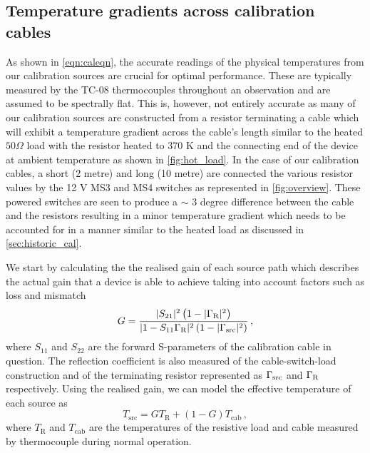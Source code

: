 \subsection{Temperature gradients across calibration cables}\label{sec:cable_gradient}
As shown in \cref{eqn:caleqn}, the accurate readings of the physical temperatures from our calibration sources are crucial for optimal performance. These are typically measured by the TC-08 thermocouples throughout an observation and are assumed to be spectrally flat. This is, however, not entirely accurate as many of our calibration sources are constructed from a resistor terminating a cable which will exhibit a temperature gradient across the cable’s length similar to the heated $50 \Omega$ load with the resistor heated to 370 K and the connecting end of the device at ambient temperature as shown in \cref{fig:hot_load}. In the case of our calibration cables, a short (2 metre) and long (10 metre) are connected the various resistor values by the 12 V MS3 and MS4 switches as represented in \cref{fig:overview}. These powered switches are seen to produce a $\sim$ 3 degree difference between the cable and the resistors resulting in a minor temperature gradient which needs to be accounted for in a manner similar to the heated load as discussed in \cref{sec:historic_cal}.

We start by calculating the the realised gain of each source path which describes the actual gain that a device is able to achieve taking into account factors such as loss and mismatch
\begin{equation}
    G = \frac{ |S_{21}|^2 \left( 1 - |\Gamma_{\mathrm{\mathrm{R}}}|^2 \right) }{ |1 - S_{11} \Gamma_{\mathrm{\mathrm{R}}}|^2 \left( 1 - |\Gamma_{\mathrm{\mathrm{src}}}|^2 \right) } \,,
    \label{eqn:av_gain}
\end{equation}
where $S_{11}$ and $S_{22}$ are the forward S-parameters of the calibration cable in question. The reflection coefficient is also measured of the cable-switch-load construction and of the terminating resistor represented as $\Gamma_{\mathrm{\mathrm{src}}}$ and $\Gamma_{\mathrm{\mathrm{R}}}$ respectively. Using the realised gain, we can model the effective temperature of each source as
\begin{equation}
    T_{\mathrm{src}} = GT_{\mathrm{R}} + (1 - G)T_{\mathrm{cab}} \,,
    \label{eqn:temp_correction}
\end{equation}
where $T_{\mathrm{R}}$ and $T_{\mathrm{cab}}$ are the temperatures of the resistive load and cable measured by thermocouple during normal operation. 

